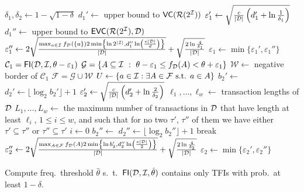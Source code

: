 \begin{algorithm}[htbp]
   \DontPrintSemicolon
  $\delta_1,\delta_2\leftarrow 1-\sqrt{1-\delta}$ 
  $d_1'\leftarrow$ upper bound to $\mathsf{VC}(\mathcal{R}(2^{\cal I}))$ 
  $\varepsilon_1' \leftarrow \sqrt{\frac{c}{|{\cal D}|}\left(d_1' + \ln\frac{1}{\delta_1}\right)}$\;
  $d_1''\leftarrow$ upper bound to $\mathsf{EVC}(\mathcal{R}(2^{\cal I}),{\cal D})$ 
  $\varepsilon_1'' \leftarrow
  2\sqrt{\frac{\max_{a\in{\cal I}}f_{\cal D}(\{a\})2\min\left\{\ln2^{|{\cal I}|},d_1''\ln\left(\frac{e|{\cal D}|}{d}\right)\right\}}{|{\cal D}|}}+\sqrt{\frac{2\ln\frac{4}{\delta_1}}{|{\cal D}|}}$\;
  $\varepsilon_1\leftarrow\min\{\varepsilon_1',\varepsilon_1''\}$\;
  $\mathcal{C}_1=\mathsf{FI}({\cal D},{\cal I},\theta-\varepsilon_1)$\;
  $\mathcal{G}=\{A\subseteq{\cal I} ~:~ \theta-\varepsilon_1\le
f_{\cal D}(A)<\theta+\varepsilon_1\}$\;
  $\mathcal{W}\leftarrow$ negative border of $\mathcal{C}_1$\;
  $\mathcal{F}=\mathcal{G}\cup\mathcal{W}$\;
  $U\leftarrow\{a\in{\cal I} : \exists A\in\mathcal{F} \mbox{ s.t. } a\in A\}$\;
  $b_2'\leftarrow$ \;
  $d_2'\leftarrow\lfloor\log_2b_2'\rfloor+1$\;
  $\varepsilon_2' \leftarrow \sqrt{\frac{c}{|{\cal D}|}\left(d_2' + \ln\frac{2}{\delta_2}\right)}$\;
  $\ell_1,\dotsc,\ell_w\leftarrow$ transaction lengths of ${\cal D}$ 
  $L_1,\dotsc,L_w\leftarrow$ the maximum number of
transactions in ${\cal D}$ that have length at least $\ell_i$, $1\le i\le w$, and
such that for no two $\tau'$, $\tau''$ of them we have either
$\tau'\subseteq\tau''$ or $\tau''\subseteq\tau'$\;
  $i\leftarrow 0$\;
  {
  $b_2''\leftarrow$ \;
  $d_2''\leftarrow\lfloor\log_2b_2''\rfloor+1$\;
  {
  break\;
  }
  }
  $\varepsilon_2'' \leftarrow
  2\sqrt{\frac{\max_{A\in\mathcal{F}}f_{\cal D}(A)2\min\left\{\ln
	b_2',d_2''\ln\left(\frac{e|{\cal D}|}{2}\right)\right\}}{|{\cal D}|}}+\sqrt{\frac{2\ln\frac{4}{\delta_2}}{|{\cal D}|}}$\;
  $\varepsilon_2\leftarrow\min\{\varepsilon_2',\varepsilon_2''\}$\;
  \caption{Compute freq.~threshold $\hat{\theta}$
  s.~t.~$\mathsf{FI}({\cal D},{\cal I},\hat{\theta})$ contains only TFIs with prob.~at least
  $1-\delta$.}
  \label{alg:vcfull}
\end{algorithm}


